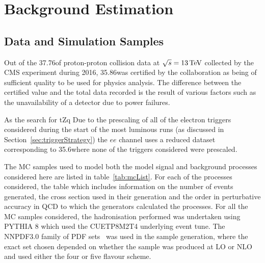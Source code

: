 \chapter{Background Estimation}\label{chapter:bkg}
%
%
%
%

\section{Data and Simulation Samples}\label{sec:samples}
Out of the 37.76\fbinv of  proton-proton collision data at $\sqrt{s} = 13\,\text{Te\hspace{-.08em}V}$ collected by the CMS experiment during 2016, 35.86\fbinv was certified by the collaboration as being of sufficient quality to be used for physics analysis.
The difference between the certified value and the total data recorded is the result of various factors such as the unavailability of a detector due to power failures.

As the search for tZq 
Due to the prescaling of all of the electron triggers considered during the start of the most luminous runs (as discussed in Section~\ref{sec:triggerStrategy}) the $ee$ channel uses a reduced dataset corresponding to 35.6\fbinv where none of the triggers considered were prescaled.

The MC samples used to model both the model signal and background processes considered here are listed in table~\ref{tab:mcList}.
For each of the processes considered, the table which includes information on the number of events generated, the cross section used in their generation and the order in perturbative accuracy in QCD to which the generators calculated the processes.
For all the MC samples considered, the hadronisation performed was undertaken using PYTHIA 8 which used the CUETP8M2T4 underlying event tune.
The NNPDF3.0 family of PDF sets~\cite{Ball:2012cx} was used in the sample generation, where the exact set chosen depended on whether the sample was produced at LO or NLO and used either the four or five flavour scheme.

